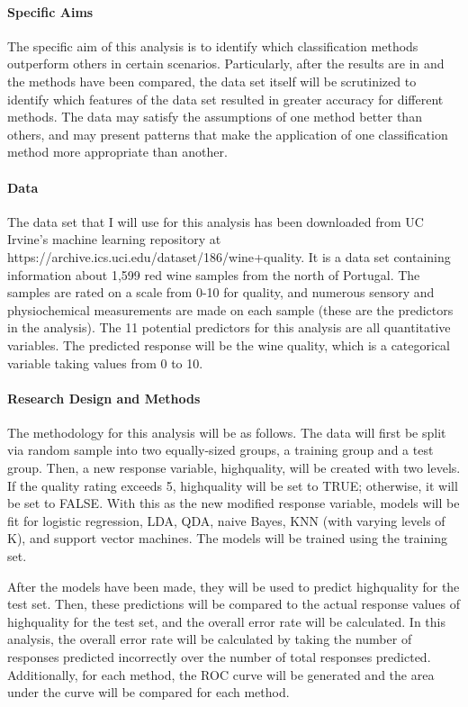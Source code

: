 \documentclass[12pt]{article}
\begin{document}
\paragraph{Specific Aims}

The specific aim of this analysis is to identify which classification methods 
outperform others in certain scenarios.  Particularly, after the results are 
in and the methods have been compared, the data set itself will be scrutinized 
to identify which features of the data set resulted in greater accuracy for 
different methods.  The data may satisfy the assumptions of one method better 
than others, and may present patterns that make the application of one 
classification method more appropriate than another.    

\paragraph{Data}

The data set that I will use for this analysis has been downloaded from UC Irvine's 
machine learning repository at https://archive.ics.uci.edu/dataset/186/wine+quality.  
It is a data set containing information about 1,599 red wine samples from the north 
of Portugal.  The samples are rated on a scale from 0-10 for quality, and numerous 
sensory and physiochemical measurements are made on each sample (these are the 
predictors in the analysis).  The 11 potential predictors for this analysis are all 
quantitative variables.  The predicted response will be the wine quality, which is 
a categorical variable taking values from 0 to 10.   

\paragraph{Research Design and Methods}

The methodology for this analysis will be as follows.  The data will first be split 
via random sample into two equally-sized groups, a training group and a test group.  
Then, a new response variable, highquality, will be created with two levels.  If 
the quality rating exceeds 5, highquality will be set to TRUE; otherwise, it will 
be set to FALSE.  With this as the new modified response variable, models will be 
fit for logistic regression, LDA, QDA, naive Bayes, KNN (with varying levels of K), 
and support vector machines.  The models will be trained using the training set.  

After the models have been made, they will be used to predict highquality for the 
test set.  Then, these predictions will be compared to the actual response values 
of highquality for the test set, and the overall error rate will be calculated.  
In this analysis, the overall error rate will be calculated by taking the number 
of responses predicted incorrectly over the number of total responses predicted.  
Additionally, for each method, the ROC curve will be generated and the area under 
the curve will be compared for each method.  
\end{document}
